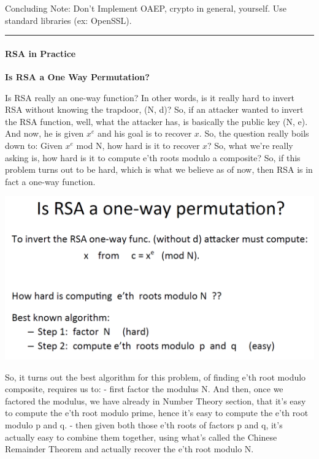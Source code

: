 \documentclass[11pt]{article}
\makeatletter
\def\maxwidth{\ifdim\Gin@nat@width>\linewidth\linewidth
    \else\Gin@nat@width\fi}
\let\Oldincludegraphics\includegraphics
\renewcommand{\includegraphics}[1]{\Oldincludegraphics[width=.8\maxwidth]{#1}}
\makeatother
\begin{document}
Concluding Note: Don't Implement OAEP, crypto in general, yourself. Use
standard libraries (ex: OpenSSL).

\begin{center}\rule{0.5\linewidth}{\linethickness}\end{center}

\hypertarget{rsa-in-practice}{%
\paragraph{RSA in Practice}\label{rsa-in-practice}}

\textbf{Is RSA a One Way Permutation?}

Is RSA really an one-way function? In other words, is it really hard to
invert RSA without knowing the trapdoor, (N, d)? So, if an attacker
wanted to invert the RSA function, well, what the attacker has, is
basically the public key (N, e). And now, he is given \(x^{e}\) and his
goal is to recover \(x\). So, the question really boils down to: Given
\(x^{e}\) mod N, how hard is it to recover \(x\)? So, what we're really
asking is, how hard is it to compute e'th roots modulo a composite? So,
if this problem turns out to be hard, which is what we believe as of
now, then RSA is in fact a one-way function.

\includegraphics{./Images/IsRSA1WayPerm.png}

So, it turns out the best algorithm for this problem, of finding e'th
root modulo composite, requires us to: - first factor the modulus N. And
then, once we factored the modulus, we have already in Number Theory
section, that it's easy to compute the e'th root modulo prime, hence
it's easy to compute the e'th root modulo p and q. - then given both
those e'th roots of factors p and q, it's actually easy to combine them
together, using what's called the Chinese Remainder Theorem and actually
recover the e'th root modulo N.
\end{document}
